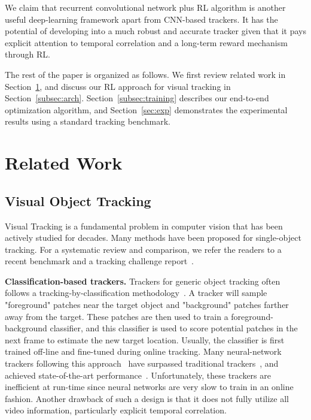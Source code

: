 \documentclass[10pt,twocolumn,letterpaper]{article}
\begin{document}
We claim that recurrent convolutional network plus RL algorithm is another useful deep-learning framework apart from CNN-based trackers. It has the potential of developing into a much robust and accurate tracker given that it pays explicit attention to temporal correlation and a long-term reward mechanism through RL.

The rest of the paper is organized as follows. We first review related work in Section~\ref{sec:relatedwork}, and discuss our RL approach for visual tracking in Section~\ref{subsec:arch}. Section~\ref{subsec:training} describes our end-to-end optimization algorithm, and Section~\ref{sec:exp} demonstrates the experimental results using a standard tracking benchmark. 

\section{Related Work}
\label{sec:relatedwork}

\subsection{Visual Object Tracking}

Visual Tracking is a fundamental problem in computer vision that has been actively studied for decades. Many methods have been proposed for single-object tracking. For a systematic review and comparison, we refer the readers to a recent benchmark and a tracking challenge report~\cite{wu2013online, kristan2015visual}.

\textbf{Classification-based trackers.} Trackers for generic object tracking often follows a tracking-by-classification methodology~\cite{kalal2012tracking,wang2015understanding}. A tracker will sample "foreground" patches near the target object and "background" patches farther away from the target. These patches are then used to train a foreground-background classifier, and this classifier is used to score potential patches in the next frame to estimate the new target location. Usually, the classifier is first trained off-line and fine-tuned during online tracking. Many neural-network trackers following this approach~\cite{hong2015online,nam2015learning,wang2015visual,zhang2015robust} have surpassed traditional trackers~\cite{babenko2011robust,hare2011struck,ross2008incremental}, and achieved state-of-the-art performance~\cite{nam2015learning,kristan2015visual}. Unfortunately, these trackers are inefficient at run-time since neural networks are very slow to train in an online fashion. Another drawback of such a design is that it does not fully utilize all video information, particularly explicit temporal correlation. 
\end{document}

